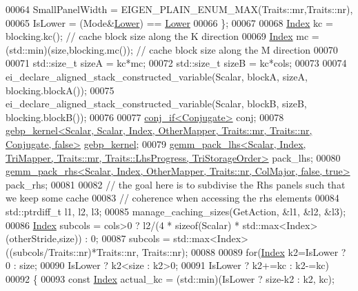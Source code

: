 \begin{DoxyCode}
00064       SmallPanelWidth   = EIGEN\_PLAIN\_ENUM\_MAX(Traits::mr,Traits::nr),
00065       IsLower = (Mode&\hyperlink{group__enums_gga39e3366ff5554d731e7dc8bb642f83cda891792b8ed394f7607ab16dd716f60e6}{Lower}) == \hyperlink{group__enums_gga39e3366ff5554d731e7dc8bb642f83cda891792b8ed394f7607ab16dd716f60e6}{Lower}
00066     \};
00067 
00068     \hyperlink{namespace_eigen_a62e77e0933482dafde8fe197d9a2cfde}{Index} kc = blocking.kc();                   \textcolor{comment}{// cache block size along the K direction}
00069     \hyperlink{namespace_eigen_a62e77e0933482dafde8fe197d9a2cfde}{Index} mc = (std::min)(size,blocking.mc());  \textcolor{comment}{// cache block size along the M direction}
00070 
00071     std::size\_t sizeA = kc*mc;
00072     std::size\_t sizeB = kc*cols;
00073 
00074     ei\_declare\_aligned\_stack\_constructed\_variable(Scalar, blockA, sizeA, blocking.blockA());
00075     ei\_declare\_aligned\_stack\_constructed\_variable(Scalar, blockB, sizeB, blocking.blockB());
00076 
00077     \hyperlink{struct_eigen_1_1internal_1_1conj__if}{conj\_if<Conjugate>} conj;
00078     
      \hyperlink{struct_eigen_1_1internal_1_1gebp__kernel}{gebp\_kernel<Scalar, Scalar, Index, OtherMapper, Traits::mr, Traits::nr, Conjugate, false>}
       \hyperlink{struct_eigen_1_1internal_1_1gebp__kernel}{gebp\_kernel};
00079     
      \hyperlink{struct_eigen_1_1internal_1_1gemm__pack__lhs}{gemm\_pack\_lhs<Scalar, Index, TriMapper, Traits::mr, Traits::LhsProgress, TriStorageOrder>}
       pack\_lhs;
00080     \hyperlink{struct_eigen_1_1internal_1_1gemm__pack__rhs}{gemm\_pack\_rhs<Scalar, Index, OtherMapper, Traits::nr, ColMajor, false, true>}
       pack\_rhs;
00081 
00082     \textcolor{comment}{// the goal here is to subdivise the Rhs panels such that we keep some cache}
00083     \textcolor{comment}{// coherence when accessing the rhs elements}
00084     std::ptrdiff\_t l1, l2, l3;
00085     manage\_caching\_sizes(GetAction, &l1, &l2, &l3);
00086     \hyperlink{namespace_eigen_a62e77e0933482dafde8fe197d9a2cfde}{Index} subcols = cols>0 ? l2/(4 * \textcolor{keyword}{sizeof}(Scalar) * std::max<Index>(otherStride,size)) : 0;
00087     subcols = std::max<Index>((subcols/Traits::nr)*Traits::nr, Traits::nr);
00088 
00089     \textcolor{keywordflow}{for}(\hyperlink{namespace_eigen_a62e77e0933482dafde8fe197d9a2cfde}{Index} k2=IsLower ? 0 : size;
00090         IsLower ? k2<size : k2>0;
00091         IsLower ? k2+=kc : k2-=kc)
00092     \{
00093       \textcolor{keyword}{const} \hyperlink{namespace_eigen_a62e77e0933482dafde8fe197d9a2cfde}{Index} actual\_kc = (std::min)(IsLower ? size-k2 : k2, kc);

\end{DoxyCode}
